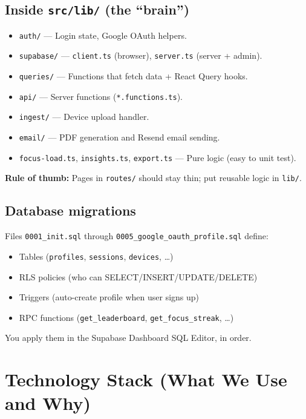 \documentclass[11pt,a4paper]{article}
\newcommand{\filepath}[1]{\texttt{#1}}
\begin{document}
\subsection{Inside \filepath{src/lib/} (the ``brain'')}

\begin{itemize}[leftmargin=*]
  \item \filepath{auth/} --- Login state, Google OAuth helpers.
  \item \filepath{supabase/} --- \texttt{client.ts} (browser), \texttt{server.ts} (server + admin).
  \item \filepath{queries/} --- Functions that fetch data + React Query hooks.
  \item \filepath{api/} --- Server functions (\texttt{*.functions.ts}).
  \item \filepath{ingest/} --- Device upload handler.
  \item \filepath{email/} --- PDF generation and Resend email sending.
  \item \filepath{focus-load.ts}, \filepath{insights.ts}, \filepath{export.ts} --- Pure logic (easy to unit test).
\end{itemize}

\textbf{Rule of thumb:} Pages in \filepath{routes/} should stay thin; put reusable logic in \filepath{lib/}.

\subsection{Database migrations}

Files \filepath{0001\_init.sql} through \filepath{0005\_google\_oauth\_profile.sql} define:

\begin{itemize}[leftmargin=*]
  \item Tables (\texttt{profiles}, \texttt{sessions}, \texttt{devices}, \ldots)
  \item RLS policies (who can SELECT/INSERT/UPDATE/DELETE)
  \item Triggers (auto-create profile when user signs up)
  \item RPC functions (\texttt{get\_leaderboard}, \texttt{get\_focus\_streak}, \ldots)
\end{itemize}

You apply them in the Supabase Dashboard SQL Editor, in order.

\section{Technology Stack (What We Use and Why)}
\end{document}
